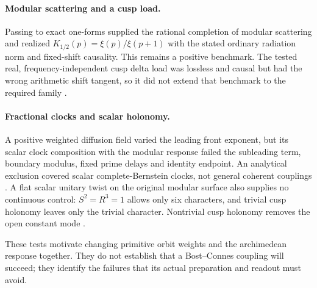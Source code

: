 \paragraph{Modular scattering and a cusp load.}
Passing to exact one-forms supplied the rational completion of modular
scattering and realized $K_{1/2}(p)=\xi(p)/\xi(p+1)$ with the stated
ordinary radiation norm and fixed-shift causality. This remains a
positive benchmark. The tested real, frequency-independent cusp delta
load was lossless and causal but had the wrong arithmetic shift
tangent, so it did not extend that benchmark to the required family
\cite{ModularNote}.

\paragraph{Fractional clocks and scalar holonomy.}
A positive weighted diffusion field varied the leading front exponent,
but its scalar clock composition with the modular response failed the
subleading term, boundary modulus, fixed prime delays and identity
endpoint. An analytical exclusion covered scalar complete-Bernstein
clocks, not general coherent couplings \cite{FractionalNote}. A flat
scalar unitary twist on the original modular surface also supplies no
continuous control: $S^2=R^3=1$ allows only six characters, and trivial
cusp holonomy leaves only the trivial character. Nontrivial cusp
holonomy removes the open constant mode \cite{OrbitNote}.

These tests motivate changing primitive orbit weights and the
archimedean response together. They do not establish that a Bost--Connes
coupling will succeed; they identify the failures that its actual
preparation and readout must avoid.
